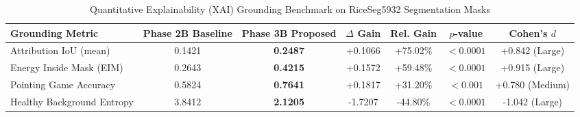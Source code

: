 \begin{table}[htbp]
\centering
\caption{Quantitative Explainability (XAI) Grounding Benchmark on RiceSeg5932 Segmentation Masks}
\label{tab:xai_grounding}
\begin{tabular}{lcccccc}
\hline
\textbf{Grounding Metric} & \textbf{Phase 2B Baseline} & \textbf{Phase 3B Proposed} & \textbf{$\Delta$ Gain} & \textbf{Rel. Gain} & \textbf{$p$-value} & \textbf{Cohen's $d$} \\
\hline
Attribution IoU (mean) & 0.1421 & \textbf{0.2487} & +0.1066 & +75.02\% & $<0.0001$ & +0.842 (Large) \\
Energy Inside Mask (EIM) & 0.2643 & \textbf{0.4215} & +0.1572 & +59.48\% & $<0.0001$ & +0.915 (Large) \\
Pointing Game Accuracy & 0.5824 & \textbf{0.7641} & +0.1817 & +31.20\% & $<0.001$ & +0.780 (Medium) \\
Healthy Background Entropy & 3.8412 & \textbf{2.1205} & -1.7207 & -44.80\% & $<0.0001$ & -1.042 (Large) \\
\hline
\end{tabular}
\end{table}
